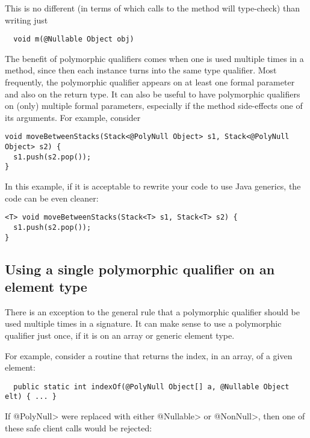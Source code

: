This is no different (in terms of which calls to the method will
type-check) than writing just

\begin{Verbatim}
  void m(@Nullable Object obj)
\end{Verbatim}

The benefit of polymorphic qualifiers comes when one is used multiple times
in a method, since then each instance turns into the same type qualifier.
Most frequently, the polymorphic qualifier appears on at least one formal
parameter and also on the return type.  It can also be useful to have
polymorphic qualifiers on (only) multiple formal parameters, especially if
the method side-effects one of its arguments.
For example, consider

\begin{Verbatim}
void moveBetweenStacks(Stack<@PolyNull Object> s1, Stack<@PolyNull Object> s2) {
  s1.push(s2.pop());
}
\end{Verbatim}

\noindent
In this example, if it is acceptable to rewrite your code to use Java
generics, the code can be even cleaner:

\begin{Verbatim}
<T> void moveBetweenStacks(Stack<T> s1, Stack<T> s2) {
  s1.push(s2.pop());
}
\end{Verbatim}




\subsection{Using a single polymorphic qualifier on an element type\label{qualifier-polymorphism-element-types}}

There is an exception to the general rule that a polymorphic qualifier
should be used multiple times in a signature.  It can make sense to use a
polymorphic qualifier just once, if it is on an array or generic element
type.

For example, consider a routine that returns the index, in an array, of a
given element:

\begin{Verbatim}
  public static int indexOf(@PolyNull Object[] a, @Nullable Object elt) { ... }
\end{Verbatim}

If \<@PolyNull> were replaced with either \<@Nullable> or \<@NonNull>, then
one of these safe client calls would be rejected:

